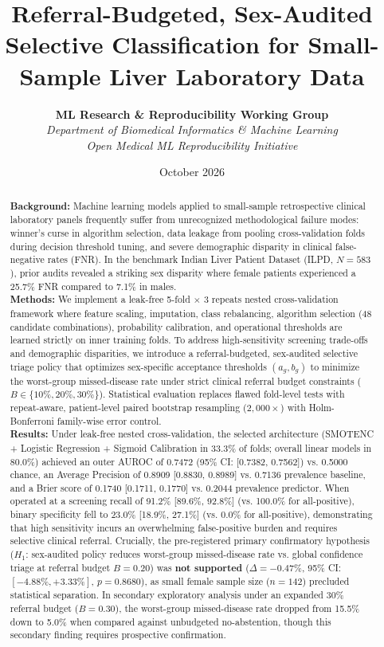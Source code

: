 \documentclass[11pt,a4paper]{article}
\title{\textbf{Referral-Budgeted, Sex-Audited Selective Classification for Small-Sample Liver Laboratory Data}}
\author{
    \textbf{ML Research \& Reproducibility Working Group} \\
    \textit{Department of Biomedical Informatics \& Machine Learning} \\
    \textit{Open Medical ML Reproducibility Initiative}
}
\date{October 2026}
\begin{document}
\maketitle

\begin{abstract}
\noindent\textbf{Background:} Machine learning models applied to small-sample retrospective clinical laboratory panels frequently suffer from unrecognized methodological failure modes: winner's curse in algorithm selection, data leakage from pooling cross-validation folds during decision threshold tuning, and severe demographic disparity in clinical false-negative rates (FNR). In the benchmark Indian Liver Patient Dataset (ILPD, $N=583$), prior audits revealed a striking sex disparity where female patients experienced a 25.7\% FNR compared to 7.1\% in males.\\
\textbf{Methods:} We implement a leak-free 5-fold $\times$ 3 repeats nested cross-validation framework where feature scaling, imputation, class rebalancing, algorithm selection (48 candidate combinations), probability calibration, and operational thresholds are learned strictly on inner training folds. To address high-sensitivity screening trade-offs and demographic disparities, we introduce a referral-budgeted, sex-audited selective triage policy that optimizes sex-specific acceptance thresholds $(a_g, b_g)$ to minimize the worst-group missed-disease rate under strict clinical referral budget constraints ($B \in \{10\%, 20\%, 30\%\}$). Statistical evaluation replaces flawed fold-level tests with repeat-aware, patient-level paired bootstrap resampling ($2,000\times$) with Holm-Bonferroni family-wise error control.\\
\textbf{Results:} Under leak-free nested cross-validation, the selected architecture (SMOTENC + Logistic Regression + Sigmoid Calibration in 33.3\% of folds; overall linear models in 80.0\%) achieved an outer AUROC of 0.7472 (95\% CI: [0.7382, 0.7562]) vs. 0.5000 chance, an Average Precision of 0.8909 [0.8830, 0.8989] vs. 0.7136 prevalence baseline, and a Brier score of 0.1740 [0.1711, 0.1770] vs. 0.2044 prevalence predictor. When operated at a screening recall of 91.2\% [89.6\%, 92.8\%] (vs. 100.0\% for all-positive), binary specificity fell to 23.0\% [18.9\%, 27.1\%] (vs. 0.0\% for all-positive), demonstrating that high sensitivity incurs an overwhelming false-positive burden and requires selective clinical referral. Crucially, the pre-registered primary confirmatory hypothesis ($H_1$: sex-audited policy reduces worst-group missed-disease rate vs. global confidence triage at referral budget $B=0.20$) was \textbf{not supported} ($\Delta = -0.47\%$, 95\% CI: $[-4.88\%, +3.33\%]$, $p=0.8680$), as small female sample size ($n=142$) precluded statistical separation. In secondary exploratory analysis under an expanded 30\% referral budget ($B=0.30$), the worst-group missed-disease rate dropped from 15.5\% down to 5.0\% when compared against unbudgeted no-abstention, though this secondary finding requires prospective confirmation.\\

\end{abstract}
\end{document}

